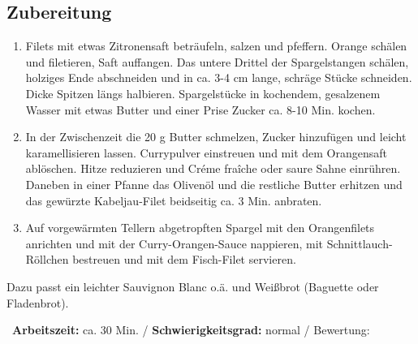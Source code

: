 \begin{minipage}[t]{0.58\textwidth}
\vspace{0pt}
\subsection*{Zubereitung}
\begin{enumerate}[leftmargin=*, itemindent=14pt]

\item Filets mit etwas Zitronensaft beträufeln, salzen und pfeffern. Orange schälen und filetieren, Saft auffangen. Das untere Drittel der Spargelstangen schälen, holziges Ende abschneiden und in ca. 3-4 cm lange, schräge Stücke schneiden. Dicke Spitzen längs halbieren. Spargelstücke in kochendem, gesalzenem Wasser mit etwas Butter und einer Prise Zucker ca. 8-10 Min. kochen. 

\item In der Zwischenzeit die 20 g Butter schmelzen, Zucker hinzufügen und leicht karamellisieren lassen. Currypulver einstreuen und mit dem Orangensaft ablöschen. Hitze reduzieren und Créme fraîche oder saure Sahne einrühren. Daneben in einer Pfanne das Olivenöl und die restliche Butter erhitzen und das gewürzte Kabeljau-Filet beidseitig ca. 3 Min. anbraten.

\item Auf vorgewärmten Tellern abgetropften Spargel mit den Orangenfilets anrichten und mit der Curry-Orangen-Sauce nappieren, mit Schnittlauch-Röllchen bestreuen und mit dem Fisch-Filet servieren. 

\end{enumerate}
Dazu passt ein leichter Sauvignon Blanc o.ä. und Weißbrot (Baguette oder Fladenbrot).
\end{minipage}
\vfill
\decothreeright \, \textbf{Arbeitszeit:} ca. 30 Min.	 / \textbf{Schwierigkeitsgrad:} normal	 / \decothreeleft \hfill Bewertung:\Circle \Circle \Circle \Circle \Circle %